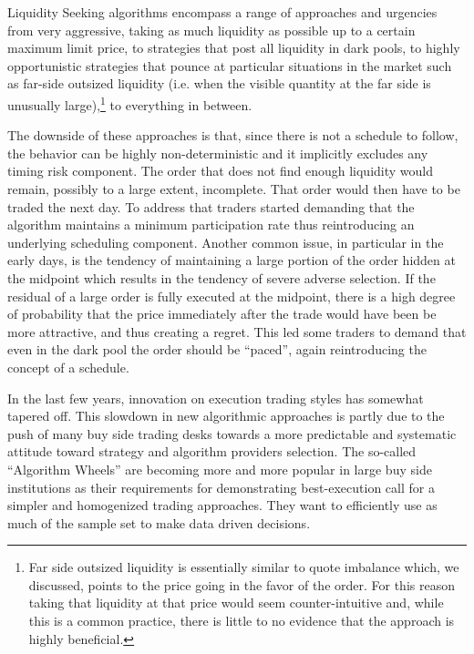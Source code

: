 Liquidity Seeking algorithms encompass a range of approaches and urgencies from very aggressive, taking as much liquidity as possible up to a certain maximum limit price, to strategies that post all liquidity in dark pools, to highly opportunistic strategies that pounce at particular situations in the market such as far-side outsized liquidity (i.e. when the visible quantity at the far side is unusually large),\footnote{Far side outsized liquidity is essentially similar to quote imbalance which, we discussed, points to the price going in the favor of the order. For this reason taking that liquidity at that price would seem counter-intuitive and, while this is a common practice,  there is little to no evidence that the approach is highly beneficial.} to everything in between.


The downside of these approaches is that, since there is not a schedule to follow, the behavior can be highly non-deterministic and it implicitly excludes any timing risk component. The order that does not find enough liquidity would remain, possibly to a large extent, incomplete. That order would then have to be traded the next day. To address that traders started demanding that the algorithm maintains a minimum participation rate thus reintroducing an underlying scheduling component. Another common issue, in particular in the early days, is the tendency of maintaining a large portion of the order hidden at the midpoint which results in the tendency of severe  adverse selection. If the residual of a large order is fully executed at the midpoint, there is a high degree of probability that the price immediately after the trade would have been be more attractive, and thus creating a regret. This led some traders to demand that even in the dark pool the order should be ``paced'', again reintroducing the concept of a schedule.


In the last few years,  innovation on execution trading styles  has somewhat tapered off. This slowdown in new algorithmic approaches is partly due to the push of many buy side trading desks towards a more predictable and systematic attitude toward strategy and algorithm providers selection. The so-called ``Algorithm Wheels'' are becoming more and more popular in large buy side institutions as their requirements for demonstrating best-execution call for a simpler and homogenized trading approaches. They want to efficiently use as much of the sample set to make data driven decisions. 


